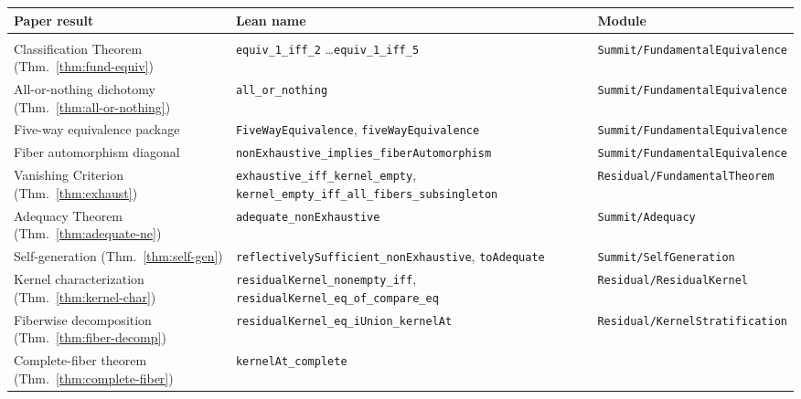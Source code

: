 \documentclass[11pt,a4paper]{article}
\theoremstyle{plain}
\theoremstyle{definition}
\theoremstyle{remark}
\begin{document}
\begingroup\sloppy
\begin{longtable}{>{\footnotesize\raggedright\arraybackslash}p{4.4cm} >{\footnotesize\raggedright\arraybackslash}p{6.4cm} >{\footnotesize\raggedright\arraybackslash}p{3.8cm}}
\toprule
\footnotesize\textbf{Paper result} & \footnotesize\textbf{Lean name} & \footnotesize\textbf{Module} \\
\midrule
\endhead
\midrule
\multicolumn{3}{r}{\small(continued)}\\
\endfoot
\bottomrule
\endlastfoot
%
Classification Theorem (Thm.~\ref{thm:fund-equiv}) &
  \texttt{equiv\_1\_iff\_2} \ldots \texttt{equiv\_1\_iff\_5} &
  \texttt{Summit/\allowbreak{}FundamentalEquivalence} \\[4pt]
%
All-or-nothing dichotomy (Thm.~\ref{thm:all-or-nothing}) &
  \texttt{all\_or\_nothing} &
  \texttt{Summit/\allowbreak{}FundamentalEquivalence} \\[4pt]
%
Five-way equivalence package &
  \texttt{FiveWayEquivalence}, \texttt{fiveWayEquivalence} &
  \texttt{Summit/\allowbreak{}FundamentalEquivalence} \\[4pt]
%
Fiber automorphism diagonal &
  \texttt{nonExhaustive\_implies\_\allowbreak{}fiberAutomorphism} &
  \texttt{Summit/\allowbreak{}FundamentalEquivalence} \\[4pt]
%
Vanishing Criterion (Thm.~\ref{thm:exhaust}) &
  \texttt{exhaustive\_iff\_\allowbreak{}kernel\_empty},
  \texttt{kernel\_empty\_iff\_\allowbreak{}all\_fibers\_\allowbreak{}subsingleton} &
  \texttt{Residual/\allowbreak{}FundamentalTheorem} \\[4pt]
%
Adequacy Theorem (Thm.~\ref{thm:adequate-ne}) &
  \texttt{adequate\_nonExhaustive} &
  \texttt{Summit/\allowbreak{}Adequacy} \\[4pt]
%
Self-generation (Thm.~\ref{thm:self-gen}) &
  \texttt{reflectivelySufficient\_\allowbreak{}nonExhaustive},
  \texttt{toAdequate} &
  \texttt{Summit/\allowbreak{}SelfGeneration} \\[4pt]
%
Kernel characterization (Thm.~\ref{thm:kernel-char}) &
  \texttt{residualKernel\_\allowbreak{}nonempty\_iff},
  \texttt{residualKernel\_eq\_\allowbreak{}of\_compare\_eq} &
  \texttt{Residual/\allowbreak{}ResidualKernel} \\[4pt]
%
Fiberwise decomposition (Thm.~\ref{thm:fiber-decomp}) &
  \texttt{residualKernel\_eq\_\allowbreak{}iUnion\_kernelAt} &
  \texttt{Residual/\allowbreak{}KernelStratification} \\[4pt]
%
Complete-fiber theorem (Thm.~\ref{thm:complete-fiber}) &
  \texttt{kernelAt\_complete} &

\end{longtable}
\end{document}
